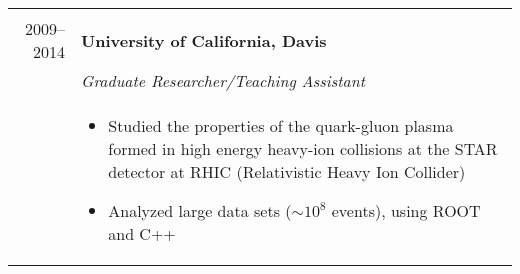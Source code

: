 \documentclass[letterpaper,10pt]{article}
\newif\ifpubl
\begin{document}
\begin{tabular}{rp{13cm}}
\begin{itemize}
			\end{itemize} \\
	2009--2014 & \textbf{University of California, Davis} \\
		& \emph{Graduate Researcher/Teaching Assistant}\\
		&
			\begin{itemize}
			\item Studied the properties of the quark-gluon plasma formed in high energy heavy-ion collisions at the STAR detector at RHIC (Relativistic Heavy Ion Collider)
			\item Analyzed large data sets ($\sim10^8$ events), using ROOT and C++
			\end{itemize} 
\end{tabular}

\ifpubl
\end{document}

